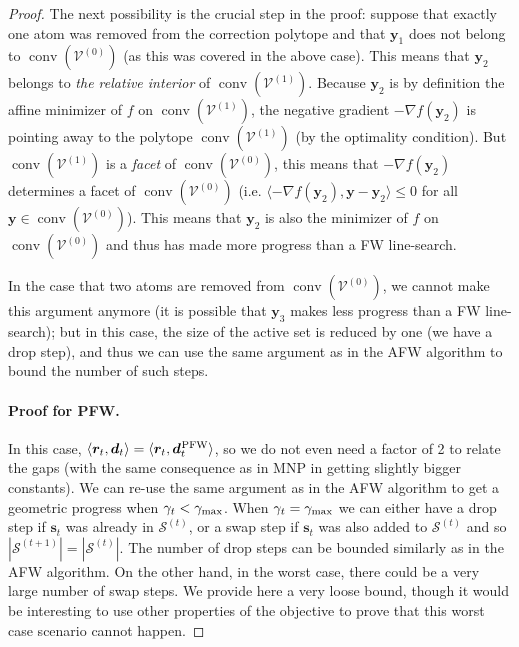 \documentclass{article} %
\DeclareMathOperator*{\conv}{conv}
\newcommand{\stepsize}{\gamma}
\newcommand{\stepmax}{\stepsize_{\textnormal{\scriptsize max}}} %
\newcommand{\PFW}{{\hspace{0.05em}\textnormal{PFW}}}
\newcommand{\y}{\bm{y}}
\newcommand{\s}{\bm{s}}
\newcommand{\dd}{\bm{d}}
\newcommand{\VVertices}{\mathcal{V}}
\newcommand{\Coreset}{\mathcal{S}}
\renewcommand{\r}{\bm{r}}
\newcommand{\innerProdCompressed}[2]{\langle #1 , #2 \rangle}
\newcommand{\0}{\mathbf{0}} %
\begin{document}
\begin{proof}
The next possibility is the crucial step in the proof: suppose that exactly one atom was removed from the correction polytope and that $\y_1$ does not belong to $\conv(\VVertices^{(0)})$ (as this was covered in the above case). This means that $\y_2$ belongs to \emph{the relative interior} of $\conv(\VVertices^{(1)})$. Because $\y_2$ is by definition the affine minimizer of $f$ on $\conv(\VVertices^{(1)})$, the negative gradient $-\nabla f(\y_2)$ is pointing away to the polytope $\conv(\VVertices^{(1)})$ (by the optimality condition). But $\conv(\VVertices^{(1)})$ is a \emph{facet} of $\conv(\VVertices^{(0)})$, this means that $-\nabla f(\y_2)$ determines a facet of $\conv(\VVertices^{(0)})$ (i.e. $\innerProdCompressed{-\nabla f(\y_2)}{\y - \y_2} \leq 0$ for all $\y \in \conv(\VVertices^{(0)})$). This means that $\y_2$ is also the minimizer of $f$ on $\conv(\VVertices^{(0)})$ and thus has made more progress than a FW line-search.

In the case that two atoms are removed from $\conv(\VVertices^{(0)})$, we cannot make this argument anymore
(it is possible that $\y_3$ makes less progress than a FW line-search); but in this case, the size of the active set is reduced by one (we have a drop step), and thus we can use the same argument as in the AFW algorithm to bound the number of such steps.

\paragraph{Proof for PFW.}
In this case, $\innerProdCompressed{\r_t}{\dd_t} = \innerProdCompressed{\r_t}{\dd_t^\PFW}$, so we do not even need a factor of 2 to relate the gaps (with the same consequence as in MNP in getting slightly bigger constants). We can re-use the same argument as in the AFW algorithm to get a geometric progress when $\stepsize_t < \stepmax$. When $\stepsize_t = \stepmax$ we can either have a drop step if $\s_t$ was already in $\Coreset^{(t)}$, or a swap step if $\s_t$ was also added to $\Coreset^{(t)}$ and so $|\Coreset^{(t+1)}| = |\Coreset^{(t)}|$. The number of drop steps can be bounded similarly as in the AFW algorithm. On the other hand, in the worst case, there could be a very large number of swap steps. We provide here a very loose bound, though it would be interesting to use other properties of the objective to prove that this worst case scenario cannot happen.


\end{proof}
\end{document}
